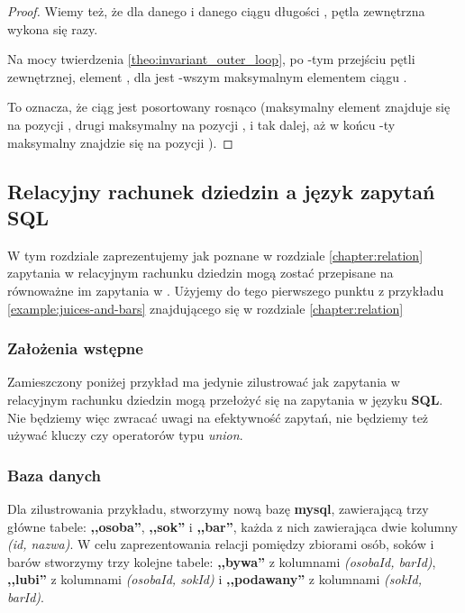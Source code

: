 \begin{example}
\begin{proof}
Wiemy też, że dla danego  i danego ciągu  długości , pętla zewnętrzna wykona się  razy. 

Na mocy twierdzenia \ref{theo:invariant_outer_loop}, po -tym przejściu pętli zewnętrznej, element , dla  jest -wszym maksymalnym elementem ciągu . 

To oznacza, że ciąg jest posortowany rosnąco (maksymalny element znajduje się na pozycji , drugi maksymalny na pozycji , i tak dalej, aż w końcu -ty maksymalny znajdzie się na pozycji ).
\end{proof}

\end{example}

\subsection{Relacyjny rachunek dziedzin a język zapytań SQL}

W tym rozdziale zaprezentujemy jak poznane w rozdziale \ref{chapter:relation} zapytania w relacyjnym rachunku dziedzin mogą zostać przepisane na równoważne im zapytania w . Użyjemy do tego pierwszego punktu z przykładu \ref{example:juices-and-bars} znajdującego się w rozdziale \ref{chapter:relation} 

\subsubsection{Założenia wstępne}
Zamieszczony poniżej przykład ma jedynie zilustrować jak zapytania w relacyjnym rachunku dziedzin mogą przełożyć się na zapytania w języku \textbf{SQL}. Nie będziemy więc zwracać uwagi na efektywność zapytań, nie będziemy też używać kluczy czy operatorów typu \textit{union}.

\subsubsection{Baza danych}

Dla zilustrowania przykładu, stworzymy nową bazę \textbf{mysql}\cite{mysql}, zawierającą trzy główne tabele: \textbf{,,osoba''}, \textbf{,,sok''} i \textbf{,,bar''}, każda z nich zawierająca dwie kolumny \textit{(id, nazwa)}. W celu zaprezentowania relacji pomiędzy zbiorami osób, soków i barów stworzymy trzy kolejne tabele: \textbf{,,bywa''} z kolumnami \textit{(osobaId, barId)}, \textbf{,,lubi''} z kolumnami \textit{(osobaId, sokId)} i \textbf{,,podawany''} z kolumnami \textit{(sokId, barId)}.


